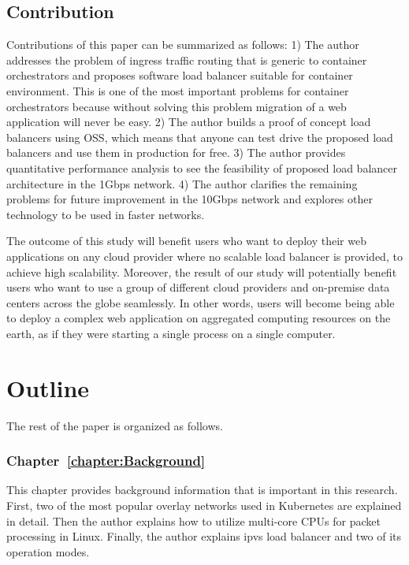 \subsection{Contribution}

Contributions of this paper can be summarized as follows:
1) The author addresses the problem of ingress traffic routing that is generic to container orchestrators and proposes software load balancer suitable for container environment.
This is one of the most important problems for container orchestrators because without solving this problem migration of a web application will never be easy.
2) The author builds a proof of concept load balancers using OSS, which means that anyone can test drive the proposed load balancers and use them in production for free.
3) The author provides quantitative performance analysis to see the feasibility of proposed load balancer architecture in the 1Gbps network.
4) The author clarifies the remaining problems for future improvement in the 10Gbps network and explores other technology to be used in faster networks.

The outcome of this study will benefit users who want to deploy their web applications on any cloud provider where no scalable load balancer is provided, to achieve high scalability.
Moreover, the result of our study will potentially benefit users who want to use a group of different cloud providers and on-premise data centers across the globe seamlessly.
In other words, users will become being able to deploy a complex web application on aggregated computing resources on the earth, as if they were starting a single process on a single computer.

\section{Outline}

The rest of the paper is organized as follows.

\subsubsection{Chapter~\ref{chapter:Background}}
This chapter provides background information that is important in this research.
First, two of the most popular overlay networks used in Kubernetes are explained in detail.
Then the author explains how to utilize multi-core CPUs for packet processing in Linux.
Finally, the author explains ipvs load balancer and two of its operation modes.

